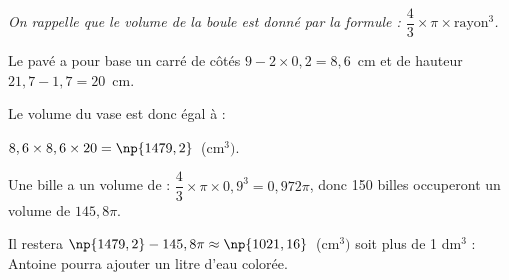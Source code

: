 \documentclass[10pt]{article}
\begin{document}
%
%
%

\smallskip

\emph{On rappelle que le volume de la boule est donné par la formule : $\dfrac{4}{3}\times \pi \times \text{rayon}^3$.} 

Le pavé a pour base un carré de côtés $9 - 2\times 0,2 = 8,6$~cm et de hauteur $21,7 - 1,7 = 20$~cm.

Le volume du vase est donc égal à :

$8,6 \times 8,6 \times 20 = \np{1479,2}$~(cm$^3)$.

Une bille a un volume de : $\dfrac{4}{3}\times \pi \times 0,9^3 = 0,972\pi$, donc 150 billes occuperont un volume de $145,8\pi$.

Il restera  $\np{1479,2} - 145,8\pi \approx \np{1021,16}$~(cm$^3)$ soit plus de 1 dm$^3$ : Antoine pourra ajouter un litre d'eau colorée.
\end{document}
